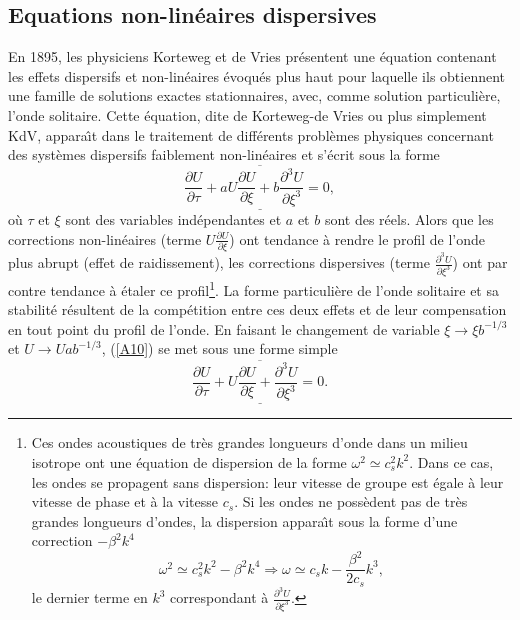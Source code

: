 \documentclass[10pt,thmsa]{article}
\begin{document}
\subsection{Equations non-lin\'{e}aires dispersives}

En 1895, les physiciens Korteweg et de Vries pr\'{e}sentent une \'{e}quation
contenant les effets dispersifs et non-lin\'{e}aires \'{e}voqu\'{e}s plus haut
pour laquelle ils obtiennent une famille de solutions exactes stationnaires,
avec, comme solution particuli\`{e}re, l'onde solitaire. Cette \'{e}quation,
dite de Korteweg-de Vries ou plus simplement KdV, appara\^{\i}t dans le
traitement de diff\'{e}rents probl\`{e}mes physiques concernant des
syst\`{e}mes dispersifs faiblement non-lin\'{e}aires et s'\'{e}crit sous la
forme
\begin{equation}
\underline{\overline{\frac{\partial U}{\partial\tau}+aU\frac{\partial
U}{\partial\xi}+b\frac{\partial^{3}U}{\partial\xi^{3}}=0,}}\label{A10}%
\end{equation}
o\`{u} $\tau$ et $\xi$ sont des variables ind\'{e}pendantes et $a$ et $b$ sont
des r\'{e}els. Alors que les corrections non-lin\'{e}aires (terme
$U\frac{\partial U}{\partial\xi}$) ont tendance \`{a} rendre le profil de
l'onde plus abrupt (effet de raidissement), les corrections dispersives (terme
$\frac{\partial^{3}U}{\partial\xi^{3}}$) ont par contre tendance \`{a}
\'{e}taler ce profil\footnote{Ces ondes acoustiques de tr\`{e}s grandes
longueurs d'onde dans un milieu isotrope ont une \'{e}quation de dispersion de
la forme $\omega^{2}\simeq c_{s}^{2}k^{2}.$ Dans ce cas, les ondes se
propagent sans dispersion: leur vitesse de groupe est \'{e}gale \`{a} leur
vitesse de phase et \`{a} la vitesse $c_{s}$. Si les ondes ne poss\`{e}dent
pas de tr\`{e}s grandes longueurs d'ondes, la dispersion appara\^{\i}t sous la
forme d'une correction $-\beta^{2}k^{4}$
\[
\omega^{2}\simeq c_{s}^{2}k^{2}-\beta^{2}k^{4}\Rightarrow\omega\simeq
c_{s}k-\frac{\beta^{2}}{2c_{s}}k^{3},
\]
le dernier terme en $k^{3}$ correspondant \`{a} $\frac{\partial^{3}U}%
{\partial\xi^{3}}.$}. La forme particuli\`{e}re de l'onde solitaire et sa
stabilit\'{e} r\'{e}sultent de la comp\'{e}tition entre ces deux effets et de
leur compensation en tout point du profil de l'onde. En faisant le changement
de variable $\xi\longrightarrow\xi b^{-1/3}$ et $U\longrightarrow Uab^{-1/3}$,
(\ref{A10}) se met sous une forme simple
\begin{equation}
\underline{\overline{\frac{\partial U}{\partial\tau}+U\frac{\partial
U}{\partial\xi}+\frac{\partial^{3}U}{\partial\xi^{3}}=0.}}\label{A11}%
\end{equation}
\end{document}
